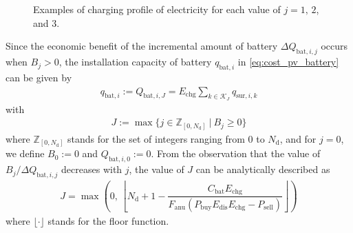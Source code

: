 \documentclass[lettersize,journal]{IEEEtran}
\begin{document}
%
%
\begin{figure}[!t]
 \centering
 \\[5mm]
 \\[5mm]
 \caption{Examples of charging profile of electricity for each value of $j=1, \, 2$, and $3$.} \label{fig:profile}
\end{figure}
%
%
Since the economic benefit of the incremental amount of battery $\Delta Q_{\mathrm{bat}, i, j}$ occurs when $B_j > 0$, the installation capacity of battery $q_{\mathrm{bat},i}$ in \eqref{eq:cost_pv_battery} can be given by 
\begin{align}
    q_{\mathrm{bat},i} := Q_{\mathrm{bat},i, J} = E_\mathrm{chg} \sum_{k \in \mathcal{K}_J} q_{\mathrm{sur}, i, k} \label{eq:battery_amount}
\end{align}
with
\begin{align}
    J := \max \{ j \in \mathbb{Z}_{[0, N_\mathrm{d}]} ~|~   B_j \ge 0  \} 
\end{align}
where $\mathbb{Z}_{[0, N_\mathrm{d}]}$ stands for the set of integers ranging from $0$ to $N_\mathrm{d}$, and for $j=0$, we define $B_0 := 0$ and $Q_{\mathrm{bat},i, 0} := 0$. 
From the observation that the value of $B_j/\Delta Q_{\mathrm{bat},i,j}$ decreases with $j$, the value of $J$ can be analytically described as 
\begin{align}
    J = \max\left( 0, \, \left\lfloor N_\mathrm{d}+1-\dfrac{C_\mathrm{bat} E_\mathrm{chg} }{F_\mathrm{anu}(P_\mathrm{buy}E_\mathrm{dis} E_\mathrm{chg} -P_\mathrm{sell} )} \right\rfloor \right) \label{eq:J_analytic}
\end{align}
where $\lfloor \cdot \rfloor$ stands for the floor function. 
\end{document}
